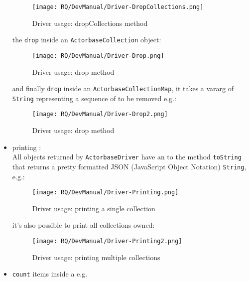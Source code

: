 \documentclass{scalatekids-article}
\begin{document}
\begin{itemize}
\begin{figure}[H]
    \begin{center}
      \texttt{[image: RQ/DevManual/Driver-DropCollections.png]}
      \caption{Driver usage: dropCollections method}
    \end{center}
  \end{figure}
  the \verb=drop= inside an \verb=ActorbaseCollection= object:
  \begin{figure}[H]
    \begin{center}
      \texttt{[image: RQ/DevManual/Driver-Drop.png]}
      \caption{Driver usage: drop method}
    \end{center}
  \end{figure}
  and finally \verb=drop= inside an \verb=ActorbaseCollectionMap=, it takes a
  vararg of \verb=String= representing a sequence of  to be removed
  e.g.:
  \begin{figure}[H]
    \begin{center}
      \texttt{[image: RQ/DevManual/Driver-Drop2.png]}
      \caption{Driver usage: drop method}
    \end{center}
  \end{figure}
\item printing :\\All objects returned by \verb=ActorbaseDriver=
  have an  to the method \verb=toString=
  that returns a pretty formatted JSON (JavaScript Object Notation) \verb=String=, e.g.:
  \begin{figure}[H]
    \begin{center}
      \texttt{[image: RQ/DevManual/Driver-Printing.png]}
      \caption{Driver usage: printing a single collection}
    \end{center}
  \end{figure}
  it's also possible to print all collections owned:
  \begin{figure}[H]
    \begin{center}
      \texttt{[image: RQ/DevManual/Driver-Printing2.png]}
      \caption{Driver usage: printing multiple collections}
    \end{center}
  \end{figure}
\item \verb=count= items inside a  e.g.
  \begin{figure}[H]
    \begin{center}

\end{center}
\end{figure}
\end{itemize}
\end{document}
